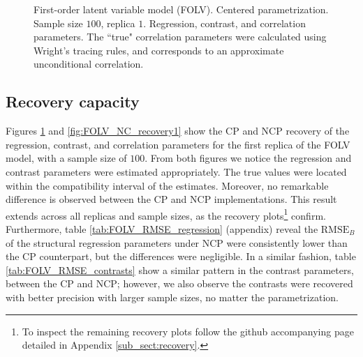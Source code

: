 %
\begin{figure}[H]
	\centering
	\begin{subfigure}
		\texttt{[image: FOLV\_CE\_J100\_Ndata1\_regression]}
	\end{subfigure}
	\begin{subfigure}
		\texttt{[image: FOLV\_CE\_J100\_Ndata1\_corr]}
	\end{subfigure}
	\caption[First-order latent variable model (FOLV). Centered parametrization. Sample size $100$, replica $1$. Regression, contrast, and correlation parameters.]%
	{First-order latent variable model (FOLV). Centered parametrization. Sample size $100$, replica $1$. Regression, contrast, and correlation parameters. The ``true" correlation parameters were calculated using Wright's tracing rules, and corresponds to an approximate unconditional correlation.}
	\label{fig:FOLV_CE_recovery1}
\end{figure}

\subsection{Recovery capacity}

Figures \ref{fig:FOLV_CE_recovery1} and \ref{fig:FOLV_NC_recovery1} show the CP and NCP recovery of the regression, contrast, and correlation parameters for the first replica of the FOLV model, with a sample size of $100$. From both figures we notice the regression and contrast parameters were estimated appropriately. The true values were located within the compatibility interval of the estimates. Moreover, no remarkable difference is observed between the CP and NCP implementations. This result extends across all replicas and sample sizes, as the recovery plots\footnote{To inspect the remaining recovery plots follow the github accompanying page detailed in Appendix \ref{sub_sect:recovery}.} confirm. Furthermore, table \ref{tab:FOLV_RMSE_regression} (appendix) reveal the $\text{RMSE}_{B}$ of the structural regression parameters under NCP were consistently lower than the CP counterpart, but the differences were negligible. In a similar fashion, table \ref{tab:FOLV_RMSE_contrasts} show a similar pattern in the contrast parameters, between the CP and NCP; however, we also observe the contrasts were recovered with better precision with larger sample sizes, no matter the parametrization.

